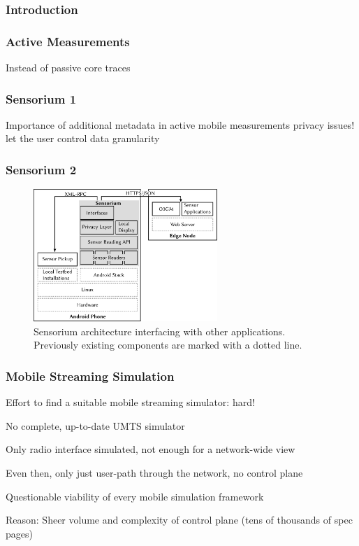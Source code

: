 \documentclass{beamer}
\begin{document}
\begin{frame}
	\frametitle{Introduction}
\end{frame}


\begin{frame}
	\frametitle{Active Measurements}

Instead of passive core traces
\end{frame}

\begin{frame}
	\frametitle{Sensorium 1}
	Importance of additional metadata in active mobile measurements
	privacy issues!
	let the user control data granularity
\end{frame}


\begin{frame}
	\frametitle{Sensorium 2}

	\begin{figure}
		\includegraphics[height=5cm]{../../chapters/06-mobilestreamingmeasurements/images/sensorium-arch.pdf}
		\caption{Sensorium architecture interfacing with other applications. Previously existing components are marked with a dotted line.}
	\end{figure}

\end{frame}


\begin{frame}
	\frametitle{Mobile Streaming Simulation}

	Effort to find a suitable mobile streaming simulator: hard!

	No complete, up-to-date UMTS simulator

	Only radio interface simulated, not enough for a network-wide view

	Even then, only just user-path through the network, no control plane

	Questionable viability of every mobile simulation framework

	Reason: Sheer volume and complexity of control plane (tens of thousands of spec pages)
\end{frame}
\end{document}
